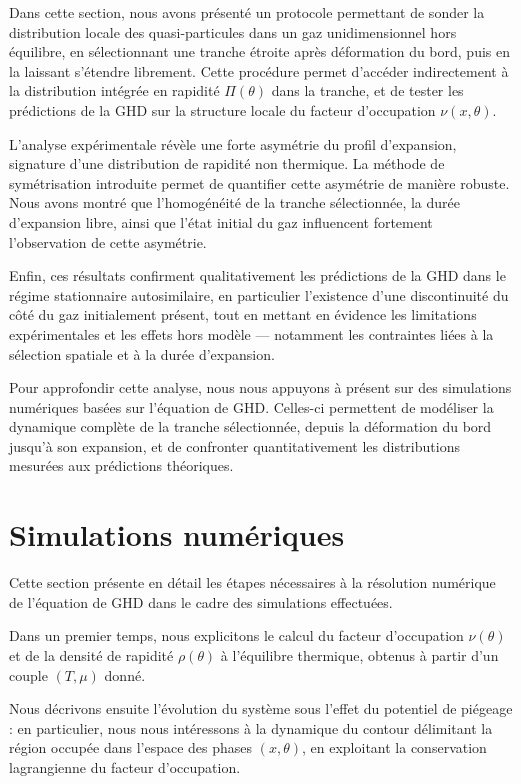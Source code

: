 Dans cette section, nous avons présenté un protocole permettant de sonder la distribution locale des quasi-particules dans un gaz unidimensionnel hors équilibre, en sélectionnant une tranche étroite après déformation du bord, puis en la laissant s’étendre librement. Cette procédure permet d’accéder indirectement à la distribution intégrée en rapidité $\Pi(\theta)$ dans la tranche, et de tester les prédictions de la GHD sur la structure locale du facteur d’occupation $\nu(x,\theta)$.

L’analyse expérimentale révèle une forte asymétrie du profil d’expansion, signature d’une distribution de rapidité non thermique. La méthode de symétrisation introduite permet de quantifier cette asymétrie de manière robuste. Nous avons montré que l’homogénéité de la tranche sélectionnée, la durée d’expansion libre, ainsi que l’état initial du gaz influencent fortement l’observation de cette asymétrie.

Enfin, ces résultats confirment qualitativement les prédictions de la GHD dans le régime stationnaire autosimilaire, en particulier l’existence d’une discontinuité du côté du gaz initialement présent, tout en mettant en évidence les limitations expérimentales et les effets hors modèle — notamment les contraintes liées à la sélection spatiale et à la durée d’expansion.

\medskip

Pour approfondir cette analyse, nous nous appuyons à présent sur des simulations numériques basées sur l’équation de GHD. Celles-ci permettent de modéliser la dynamique complète de la tranche sélectionnée, depuis la déformation du bord jusqu’à son expansion, et de confronter quantitativement les distributions mesurées aux prédictions théoriques.


\section{Simulations numériques}
\label{sec:simulations}

Cette section présente en détail les étapes nécessaires à la résolution numérique de l’équation de GHD dans le cadre des simulations effectuées.

Dans un premier temps, nous explicitons le calcul du facteur d’occupation $\nu(\theta)$ et de la densité de rapidité $\rho(\theta)$ à l’équilibre thermique, obtenus à partir d’un couple $(T, \mu)$ donné.

Nous décrivons ensuite l’évolution du système sous l’effet du potentiel de piégeage : en particulier, nous nous intéressons à la dynamique du contour délimitant la région occupée dans l’espace des phases $(x, \theta)$, en exploitant la conservation lagrangienne du facteur d’occupation.


